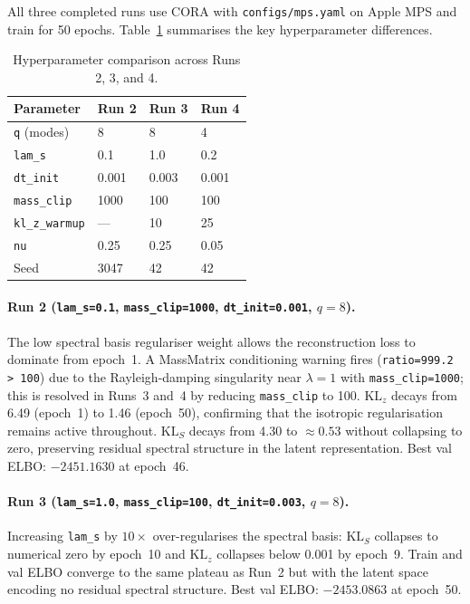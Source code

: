 \documentclass[11pt,a4paper]{article}
\begin{document}
All three completed runs use CORA with \texttt{configs/mps.yaml} on Apple MPS
and train for 50 epochs.
Table~\ref{tab:runs} summarises the key hyperparameter differences.

\begin{table}[ht]
  \centering
  \caption{Hyperparameter comparison across Runs 2, 3, and 4.}
  \label{tab:runs}
  \begin{tabular}{llll}
    \toprule
    \textbf{Parameter}   & \textbf{Run 2} & \textbf{Run 3} & \textbf{Run 4} \\
    \midrule
    \texttt{q} (modes)    & 8     & 8     & 4 \\
    \texttt{lam\_s}       & 0.1   & 1.0   & 0.2 \\
    \texttt{dt\_init}     & 0.001 & 0.003 & 0.001 \\
    \texttt{mass\_clip}   & 1000  & 100   & 100 \\
    \texttt{kl\_z\_warmup} & ---  & 10    & 25 \\
    \texttt{nu}           & 0.25  & 0.25  & 0.05 \\
    Seed                  & 3047  & 42    & 42 \\
    \bottomrule
  \end{tabular}
\end{table}

\paragraph{Run 2 (\texttt{lam\_s=0.1}, \texttt{mass\_clip=1000},
  \texttt{dt\_init=0.001}, $q=8$).}
The low spectral basis regulariser weight allows the reconstruction loss to
dominate from epoch~1.
A MassMatrix conditioning warning fires (\texttt{ratio=999.2 > 100}) due to
the Rayleigh-damping singularity near $\lambda=1$ with \texttt{mass\_clip=1000};
this is resolved in Runs~3 and~4 by reducing \texttt{mass\_clip} to 100.
$\mathrm{KL}_z$ decays from 6.49 (epoch~1) to 1.46 (epoch~50), confirming
that the isotropic regularisation remains active throughout.
$\mathrm{KL}_S$ decays from 4.30 to ${\approx}0.53$ without collapsing to
zero, preserving residual spectral structure in the latent representation.
Best val ELBO: $\mathbf{-2451.1630}$ at epoch~46.

\paragraph{Run 3 (\texttt{lam\_s=1.0}, \texttt{mass\_clip=100},
  \texttt{dt\_init=0.003}, $q=8$).}
Increasing \texttt{lam\_s} by $10\times$ over-regularises the spectral basis:
$\mathrm{KL}_S$ collapses to numerical zero by epoch~10 and $\mathrm{KL}_z$
collapses below 0.001 by epoch~9.
Train and val ELBO converge to the same plateau as Run~2 but with the latent
space encoding no residual spectral structure.
Best val ELBO: $\mathbf{-2453.0863}$ at epoch~50.
\end{document}
